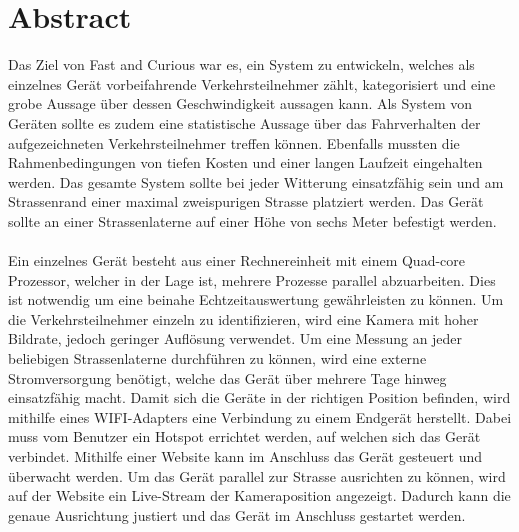 \section{Abstract}
Das Ziel von Fast and Curious war es, ein System zu entwickeln, welches als einzelnes Gerät vorbeifahrende Verkehrsteilnehmer zählt, kategorisiert und eine grobe Aussage über dessen Geschwindigkeit aussagen kann. Als System von Geräten sollte es zudem eine statistische Aussage über das Fahrverhalten der aufgezeichneten Verkehrsteilnehmer treffen können. Ebenfalls mussten die Rahmenbedingungen von tiefen Kosten und einer langen Laufzeit eingehalten werden. Das gesamte System sollte bei jeder Witterung einsatzfähig sein und am Strassenrand einer maximal zweispurigen Strasse platziert werden. Das Gerät sollte an einer Strassenlaterne auf einer Höhe von sechs Meter befestigt werden.\\\\
Ein einzelnes Gerät besteht aus einer Rechnereinheit mit einem Quad-core Prozessor, welcher in der Lage ist, mehrere Prozesse parallel abzuarbeiten. Dies ist notwendig um eine beinahe Echtzeitauswertung gewährleisten zu können. Um die Verkehrsteilnehmer einzeln zu identifizieren, wird eine Kamera mit hoher Bildrate, jedoch geringer Auflösung verwendet. Um eine Messung an jeder beliebigen Strassenlaterne durchführen zu können, wird eine externe Stromversorgung benötigt, welche das Gerät über mehrere Tage hinweg einsatzfähig macht. Damit sich die Geräte in der richtigen Position befinden, wird mithilfe eines WIFI-Adapters eine Verbindung zu einem Endgerät herstellt. Dabei muss vom Benutzer ein Hotspot errichtet werden, auf welchen sich das Gerät verbindet. Mithilfe einer Website kann im Anschluss das Gerät gesteuert und überwacht werden. Um das Gerät parallel zur Strasse ausrichten zu können, wird auf der Website ein Live-Stream der Kameraposition angezeigt. Dadurch kann die genaue Ausrichtung justiert und das Gerät im Anschluss gestartet werden.\\\\
